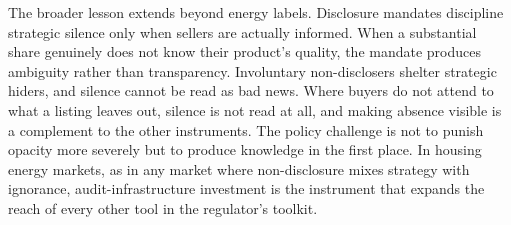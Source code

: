 The broader lesson extends beyond energy labels. Disclosure mandates discipline strategic silence only when sellers are actually informed. When a substantial share genuinely does not know their product's quality, the mandate produces ambiguity rather than transparency. Involuntary non-disclosers shelter strategic hiders, and silence cannot be read as bad news. Where buyers do not attend to what a listing leaves out, silence is not read at all, and making absence visible is a complement to the other instruments. %
 The policy challenge is not to punish opacity more severely but to produce knowledge in the first place. In housing energy markets, as in any market where non-disclosure mixes strategy with ignorance, audit-infrastructure investment is the instrument that expands the reach of every other tool in the regulator's toolkit.
